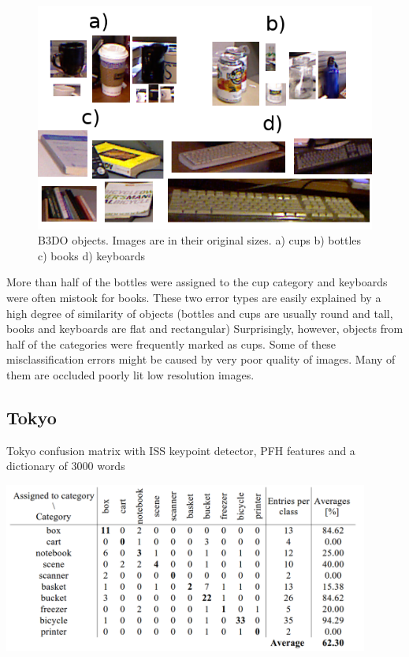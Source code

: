 	\begin{figure}[!ht]
	\centering	
	\includegraphics[width=.75\textwidth]{../figs/b3do_objects}
	\caption{B3DO objects. Images are in their original sizes. a) cups b) bottles c) books d) keyboards}
	\label{fig:b3do_objects}
	\end{figure}
	
	More than half of the bottles were assigned to the cup category and keyboards were often mistook for books. These two error types are easily explained by a high degree of similarity of objects (bottles and cups are usually round and tall, books and keyboards are flat and rectangular) Surprisingly, however, objects from half of the categories were frequently marked as cups. Some of these misclassification errors might be caused by very poor quality of images. Many of them are occluded poorly lit low resolution images.	
	
	\subsection{Tokyo}
	\begin{table}[!ht]
	\centering
	\caption{Tokyo confusion matrix with ISS keypoint detector, PFH features and a dictionary of 3000 words}
	\includegraphics[width=0.9\textwidth]{../figs/tokyo_conf_matrix}	
	\label{tab:tokyo_conf_matrix}
	\end{table}
	
